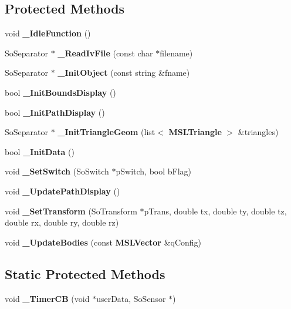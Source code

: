 \subsection*{Protected Methods}
\begin{CompactItemize}
\item 
void {\bf \_\-Idle\-Function} ()
\item 
So\-Separator $\ast$ {\bf \_\-Read\-Iv\-File} (const char $\ast$filename)
\item 
So\-Separator $\ast$ {\bf \_\-Init\-Object} (const string \&fname)
\item 
bool {\bf \_\-Init\-Bounds\-Display} ()
\item 
bool {\bf \_\-Init\-Path\-Display} ()
\item 
So\-Separator $\ast$ {\bf \_\-Init\-Triangle\-Geom} (list$<$ {\bf MSLTriangle} $>$ \&triangles)
\item 
bool {\bf \_\-Init\-Data} ()
\item 
void {\bf \_\-Set\-Switch} (So\-Switch $\ast$p\-Switch, bool b\-Flag)
\item 
void {\bf \_\-Update\-Path\-Display} ()
\item 
void {\bf \_\-Set\-Transform} (So\-Transform $\ast$p\-Trans, double tx, double ty, double tz, double rx, double ry, double rz)
\item 
void {\bf \_\-Update\-Bodies} (const {\bf MSLVector} \&q\-Config)
\end{CompactItemize}
\subsection*{Static Protected Methods}
\begin{CompactItemize}
\item 
void {\bf \_\-Timer\-CB} (void $\ast$user\-Data, So\-Sensor $\ast$)
\end{CompactItemize}
